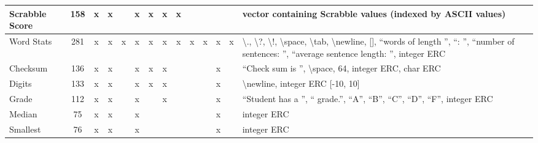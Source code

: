 \documentclass{sig-alternate}
\begin{document}
\begin{table*}[t]
\begin{tabular}{|>{\raggedright}p{3.1cm}|c|ccccccccccc|>{\raggedright}p{5.5cm}|}
\hline
Scrabble Score             & 158             & x    & x       &       & x       & x    & x      & x                  &                  &                   &       &            & vector containing Scrabble values (indexed by ASCII values)                                                                                                                                                                 \tabularnewline
\hline
Word Stats                 & 281             & x    & x       & x     & x       & x    & x      & x                  & x                & x                 & x     & x          & \textbackslash ., \textbackslash ?, \textbackslash !, \textbackslash space, \textbackslash tab, \textbackslash newline, {[}{]}, ``words of length '', ``: '', ``number of sentences: '', ``average sentence length: '', integer ERC \tabularnewline
\hline
Checksum                   & 136             & x    & x       &       & x       & x    & x      &                    &                  &                   & x     &            & ``Check sum is '', \textbackslash space, 64, integer ERC, char ERC                                                                                                                                                            \tabularnewline
\hline
Digits                     & 133             & x    & x       &       & x       & x    & x      &                    &                  &                   & x     &            & \textbackslash newline, integer ERC {[}-10, 10{]}                                                                                                                                                                           \tabularnewline
\hline
Grade                      & 112             & x    & x       &       & x       &      & x      &                    &                  &                   & x     &            & ``Student has a '', `` grade.'', ``A'', ``B'', ``C'', ``D'', ``F'', integer ERC                                                                                                                                                           \tabularnewline
\hline
Median                     & 75              & x    & x       &       & x       &      &        &                    &                  &                   & x     &            & integer ERC                                                                                                                                                                                                                 \tabularnewline
\hline
Smallest                   & 76              & x    & x       &       & x       &      &        &                    &                  &                   & x     &            & integer ERC                                                                                                                                                                                                                 \tabularnewline

\end{tabular}
\end{table*}
\end{document}
